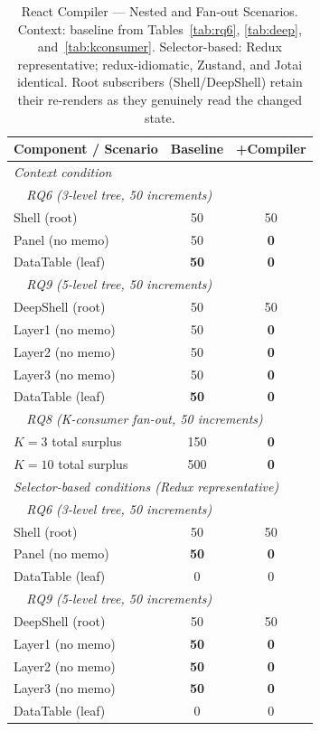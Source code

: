 \documentclass[conference]{IEEEtran}
\begin{document}
\begin{table}[!ht]
\caption{React Compiler --- Nested and Fan-out Scenarios.
  Context: baseline from Tables~\ref{tab:rq6}, \ref{tab:deep},
  and~\ref{tab:kconsumer}.  Selector-based: Redux representative;
  redux-idiomatic, Zustand, and Jotai identical.
  Root subscribers (Shell/DeepShell) retain their re-renders
  as they genuinely read the changed state.}
\label{tab:compiler-nest}
\begin{center}
\small
\setlength{\tabcolsep}{4pt}
\begin{tabular}{lcc}
\toprule
\textbf{Component / Scenario} & \textbf{Baseline} & \textbf{+Compiler} \\
\midrule
\multicolumn{3}{l}{\textit{Context condition}} \\
\multicolumn{3}{l}{\textit{~~RQ6 (3-level tree, 50 increments)}} \\
Shell (root)           & 50  & 50 \\
Panel (no memo)        & 50  & \textbf{0} \\
DataTable (leaf)       & \textbf{50} & \textbf{0} \\
\multicolumn{3}{l}{\textit{~~RQ9 (5-level tree, 50 increments)}} \\
DeepShell (root)       & 50  & 50 \\
Layer1 (no memo)       & 50  & \textbf{0} \\
Layer2 (no memo)       & 50  & \textbf{0} \\
Layer3 (no memo)       & 50  & \textbf{0} \\
DataTable (leaf)       & \textbf{50} & \textbf{0} \\
\multicolumn{3}{l}{\textit{~~RQ8 (K-consumer fan-out, 50 increments)}} \\
$K{=}3$ total surplus  & 150 & \textbf{0} \\
$K{=}10$ total surplus & 500 & \textbf{0} \\
\midrule
\multicolumn{3}{l}{\textit{Selector-based conditions (Redux representative)}} \\
\multicolumn{3}{l}{\textit{~~RQ6 (3-level tree, 50 increments)}} \\
Shell (root)           & 50           & 50 \\
Panel (no memo)        & \textbf{50}  & \textbf{0} \\
DataTable (leaf)       & 0            & 0 \\
\multicolumn{3}{l}{\textit{~~RQ9 (5-level tree, 50 increments)}} \\
DeepShell (root)       & 50           & 50 \\
Layer1 (no memo)       & \textbf{50}  & \textbf{0} \\
Layer2 (no memo)       & \textbf{50}  & \textbf{0} \\
Layer3 (no memo)       & \textbf{50}  & \textbf{0} \\
DataTable (leaf)       & 0            & 0 \\
\bottomrule
\end{tabular}
\end{center}
\end{table}
\end{document}
